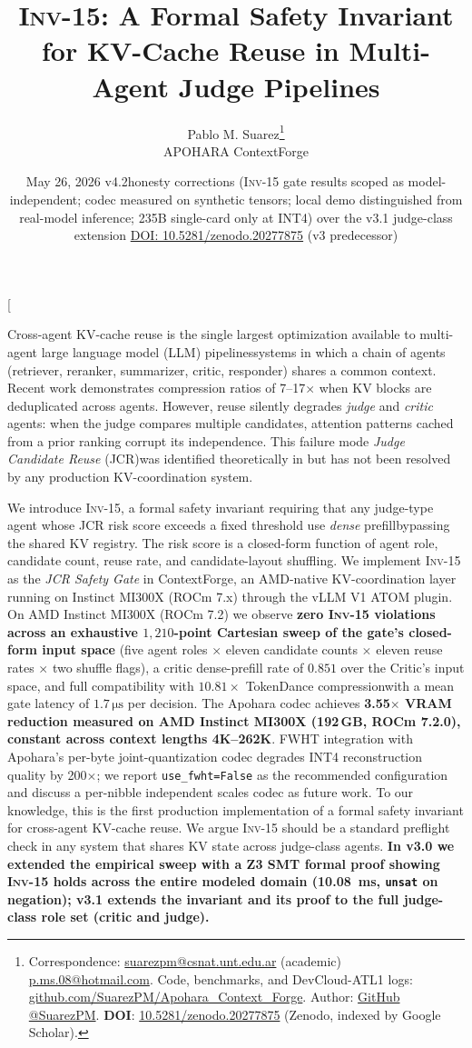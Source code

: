 \documentclass[10pt,twocolumn]{article}
\title{\textbf{\textsc{Inv-15}}: A Formal Safety Invariant for KV-Cache
       Reuse in Multi-Agent Judge Pipelines}
\author{Pablo M. Suarez\thanks{Correspondence:
        \href{mailto:suarezpm@csnat.unt.edu.ar}{suarezpm@csnat.unt.edu.ar}
        (academic) \textperiodcentered{}
        \href{mailto:p.ms.08@hotmail.com}{p.ms.08@hotmail.com}.
        Code, benchmarks, and DevCloud-ATL1 logs:
        \href{https://github.com/SuarezPM/Apohara\_Context\_Forge}%
             {github.com/SuarezPM/Apohara\_Context\_Forge}.
        Author: \href{https://github.com/SuarezPM}{GitHub @SuarezPM}.
        \textbf{DOI}: \href{https://doi.org/10.5281/zenodo.20277875}%
             {10.5281/zenodo.20277875} (Zenodo, indexed by Google Scholar).}\\
        APOHARA \textperiodcentered{} ContextForge}
\date{May 26, 2026 \textperiodcentered{} v4.2\textemdash honesty corrections
      (\textsc{Inv}-15 gate results scoped as model-independent; codec measured
      on synthetic tensors; local demo distinguished from real-model inference;
      235B single-card only at INT4) over the v3.1 judge-class extension
      \textperiodcentered{}
      \href{https://doi.org/10.5281/zenodo.20277875}%
           {DOI: 10.5281/zenodo.20277875} (v3 predecessor)}
\newcommand{\INV}[1]{\textsc{Inv-#1}}
\begin{document}
\twocolumn[
  \maketitle
  \begin{onecolabstract}
    \noindent
    Cross-agent KV-cache reuse is the single largest optimization available to
    multi-agent large language model (LLM) pipelines\textemdash systems in
    which a chain of agents (retriever, reranker, summarizer, critic,
    responder) shares a common context. Recent work
    \cite{kvcomm,tokendance,lmcache} demonstrates compression ratios of
    7--17$\times$ when KV blocks are deduplicated across agents. However,
    reuse silently degrades \emph{judge} and \emph{critic} agents: when the
    judge compares multiple candidates, attention patterns cached from a
    prior ranking corrupt its independence. This failure mode\textemdash
    \emph{Judge Candidate Reuse} (JCR)\textemdash was identified
    theoretically in \cite{jcrfailure} but has not been resolved by any
    production KV-coordination system.

    We introduce \INV{15}, a formal safety invariant requiring that any
    judge-type agent whose JCR risk score exceeds a fixed threshold use
    \emph{dense} prefill\textemdash bypassing the shared KV registry. The risk
    score is a closed-form function of agent role, candidate count, reuse
    rate, and candidate-layout shuffling. We implement \INV{15} as the
    \emph{JCR Safety Gate} in ContextForge, an AMD-native KV-coordination
    layer running on Instinct MI300X (ROCm 7.x) through the vLLM V1 ATOM
    plugin. On AMD Instinct MI300X (ROCm 7.2) we
    observe \textbf{zero \INV{15} violations across an exhaustive
    $1{,}210$-point Cartesian sweep of the gate's closed-form input
    space} (five agent roles $\times$ eleven
    candidate counts $\times$ eleven reuse rates $\times$ two shuffle
    flags), a critic dense-prefill rate of $0.851$ over the Critic's
    input space, and full compatibility with $10.81\times$ TokenDance
    compression\textemdash with a mean gate latency of $1.7\,\mathrm{\mu s}$
    per decision. The Apohara codec achieves
    \textbf{3.55$\times$ VRAM reduction measured on AMD Instinct MI300X
    (192\,GB, ROCm 7.2.0), constant across context lengths 4K--262K}.
    FWHT integration with Apohara's per-byte joint-quantization codec
    degrades INT4 reconstruction quality by 200$\times$; we report
    \texttt{use\_fwht=False} as the recommended configuration and discuss
    a per-nibble independent scales codec as future work.
    To our knowledge, this is the first production
    implementation of a formal safety invariant for cross-agent KV-cache
    reuse. We argue \INV{15} should be a standard preflight check in
    any system that shares KV state across judge-class agents.
    \textbf{In v3.0 we extended the empirical sweep with a Z3 SMT formal
    proof showing \INV{15} holds across the entire modeled domain
    (10.08~ms, \texttt{unsat} on negation); v3.1 extends the invariant and
    its proof to the full judge-class role set (critic and judge).}


\end{onecolabstract}
\end{document}
